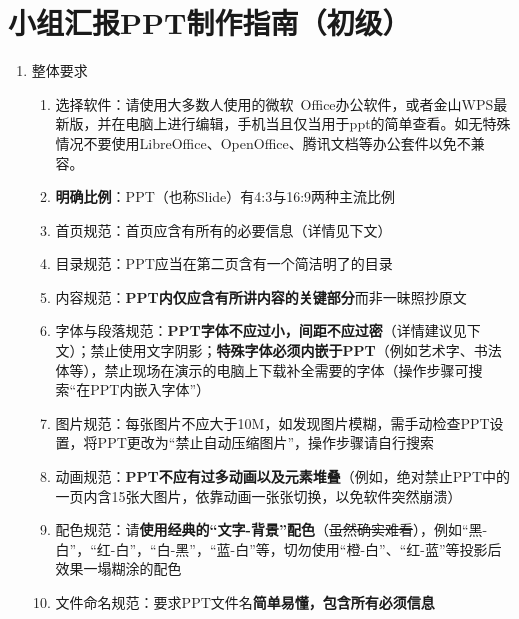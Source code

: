 \section[小组汇报PPT制作指南（初级）]{小组汇报PPT制作指南（初级）}
\begin{enumerate}
      \item 整体要求
            \begin{enumerate}
                  \item 选择软件：请使用大多数人使用的微软\ Office办公软件，或者金山WPS最新版，并在电脑上进行编辑，手机当且仅当用于ppt的简单查看。如无特殊情况不要使用LibreOffice、OpenOffice、腾讯文档等办公套件以免不兼容。
                  \item \textbf{明确比例}：PPT（也称Slide）有4:3与16:9两种主流比例\footnotemark
                  \item 首页规范：首页应含有所有的必要信息（详情见下文）
                  \item 目录规范：PPT应当在第二页含有一个简洁明了的目录
                  \item 内容规范：\textbf{PPT内仅应含有所讲内容的关键部分}而非一昧照抄原文
                  \item 字体与段落规范：\textbf{PPT字体不应过小，间距不应过密}（详情建议见下文）；禁止使用文字阴影；\textbf{特殊字体必须内嵌于PPT}（例如艺术字、书法体等），禁止现场在演示的电脑上下载补全需要的字体（操作步骤可搜索“在PPT内嵌入字体”）
                  \item 图片规范：每张图片不应大于10M\footnotemark，如发现图片模糊，需手动检查PPT设置，将PPT更改为“禁止自动压缩图片”，操作步骤请自行搜索
                  \item 动画规范：\textbf{PPT不应有过多动画以及元素堆叠}（例如，绝对禁止PPT中的一页内含15张大图片，依靠动画一张张切换，以免软件突然崩溃）
                  \item 配色规范：请\textbf{使用经典的“文字-背景”配色}（\sout{虽然确实难看}），例如“黑-白”，“红-白”，\linebreak[3]“白-黑”，“蓝-白”等，切勿使用“橙-白”、“红-蓝”等投影后效果一塌糊涂的配色\footnotemark
                  \item 文件命名规范：要求PPT文件名\textbf{简单易懂，包含所有必须信息}

\end{enumerate}
\end{enumerate}
